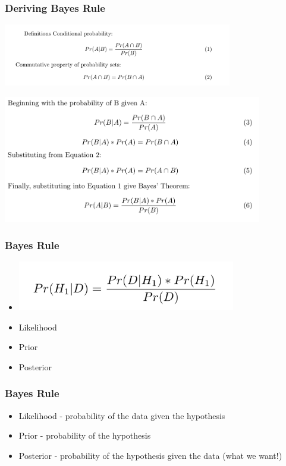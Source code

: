 \documentclass[14pt,handout]{beamer}
\begin{document}
\begin{frame}
\frametitle{Deriving Bayes Rule}
	\begin{center}
	\includegraphics[width=0.75\textwidth]{images_20171130_bayes_1and2.png}
	\end{center}
	\begin{center}
	\includegraphics[width=0.85\textwidth]{images_20171130_bayes.png}
	\end{center}
\end{frame}

\begin{frame}
\frametitle{Bayes Rule}
\begin{itemize}
\item[] 
	\begin{center}
	\includegraphics[width=0.75\textwidth]{images_20171130_bayes_final.png}
	\end{center}
	\item<+-> Likelihood
	\item<+-> Prior
	\item<+-> Posterior
\end{itemize}
\end{frame}

\begin{frame}
\frametitle{Bayes Rule}
\begin{itemize}
	\item<+-> Likelihood - probability of the data given the hypothesis
	\item<+-> Prior - probability of the hypothesis
	\item<+-> Posterior - probability of the hypothesis given the data (what we want!)
\end{itemize}
\end{frame}
\end{document}
